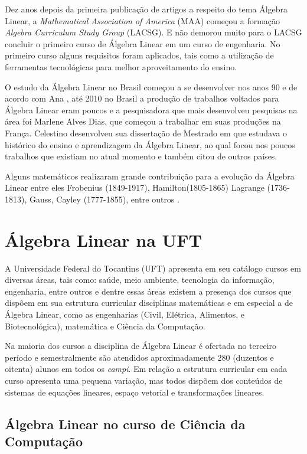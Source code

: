 Dez anos depois da primeira publicação de artigos a respeito do tema Álgebra Linear, a \textit{Mathematical Association of America} (MAA) começou a formação \textit{Algebra Curriculum Study Group} (LACSG). E não demorou muito para o LACSG concluir o primeiro curso de Álgebra Linear em um curso de engenharia. No primeiro curso alguns requisitos foram aplicados, tais como a utilização de ferramentas tecnológicas para melhor aproveitamento do ensino.

O estudo da Álgebra Linear no Brasil começou a se desenvolver nos anos 90 e de acordo com Ana \cite{2010:furtado}, até 2010 no Brasil a produção de trabalhos voltados para Álgebra Linear eram poucos e a pesquisadora que mais desenvolveu pesquisas na área foi Marlene Alves Dias, que começou a trabalhar em suas produções na França. Celestino \cite{2000:celestino} desenvolveu sua dissertação de Mestrado em que estudava o histórico do ensino e aprendizagem da Álgebra Linear, ao qual focou nos poucos trabalhos que existiam no atual momento e também citou de outros países.

Alguns matemáticos realizaram grande contribuição para a evolução da Álgebra Linear entre eles Frobenius (1849-1917), Hamilton(1805-1865) Lagrange (1736-1813), Gauss, Cayley (1777-1855), entre outros \cite{2013:Teixeira}.

\section{Álgebra Linear na UFT}

\noindent A Universidade Federal do Tocantins (UFT) apresenta em seu catálogo cursos em diversas áreas, tais como: saúde, meio ambiente, tecnologia da informação, engenharia, entre outros e dentre essas áreas existem a presença dos cursos que dispõem em sua estrutura curricular disciplinas matemáticas e em especial a de Álgebra Linear, como as engenharias (Civil, Elétrica, Alimentos, e Biotecnológica), matemática e Ciência da Computação.

Na maioria dos cursos a disciplina de Álgebra Linear é ofertada no terceiro período e semestralmente são atendidos aproximadamente 280 (duzentos e oitenta) alunos em todos os \textit{campi}. Em relação a estrutura curricular em cada curso apresenta uma pequena variação, mas todos dispõem dos conteúdos de sistemas de equações lineares, espaço vetorial e transformações lineares.

\subsection{Álgebra Linear no curso de Ciência da Computação}

